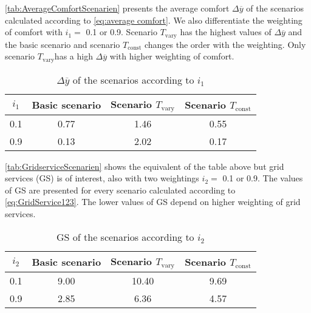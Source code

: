 \autoref{tab:AverageComfortScenarien} presents the average comfort $\Delta \overline{y}$ of the scenarios calculated according to \autoref{eq:average comfort}. We also differentiate the weighting of comfort with $i_\text{1} =$ 0.1 or 0.9. Scenario $T_\text{vary}$ has the highest values of $\Delta \overline{y}$ and the basic scenario and scenario $T_\text{const}$ changes the order with the weighting. Only scenario $T_\text{vary}$has a high $\Delta \overline{y}$ with higher weighting of comfort.  
    \begin{table}[H]
        \centering
        \begin{tabular}{c||c|c|c}
          $i_\text{1}$  &  Basic scenario & Scenario $T_\text{vary}$& Scenario $T_\text{const}$\\
          \hline  \hline
             0.1 & 0.77 & 1.46 & 0.55\\
             0.9 & 0.13 & 2.02 & 0.17\\
        \end{tabular}
        \caption{$\Delta \overline{y}$ of the scenarios according to $i_\text{1}$}
        \label{tab:AverageComfortScenarien}
    \end{table}
    
\autoref{tab:GridserviceScenarien} shows the equivalent of the table above but grid services (GS) is of interest, also with two weightings  $i_\text{2} =$ 0.1 or 0.9. The values of GS are presented for every scenario calculated according to \autoref{eq:GridService123}. The lower values of GS depend on higher weighting of grid services. 
    \begin{table}[H]
        \centering
        \begin{tabular}{c||c|c|c}
          $i_\text{2}$  &  Basic scenario & Scenario $T_\text{vary}$& Scenario $T_\text{const}$\\
          \hline  \hline
             0.1 & 9.00 & 10.40 & 9.69 \\
             0.9 & 2.85 & 6.36 & 4.57\\
        \end{tabular}
        \caption{GS of the scenarios according to $i_\text{2}$}
        \label{tab:GridserviceScenarien}
    \end{table}
    
